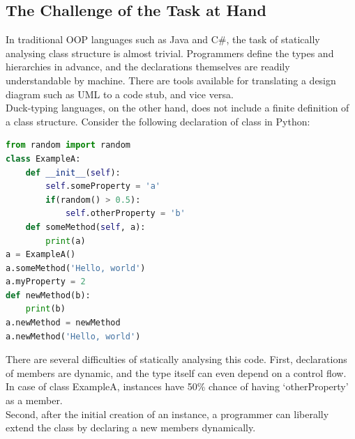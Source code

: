 \documentclass[a4paper,12pt]{article}
\begin{document}
\subsection{The Challenge of the Task at Hand}
In traditional OOP languages such as Java and C\#, the task of statically analysing class structure is almost trivial. Programmers define the types and hierarchies in advance, and the declarations themselves are readily understandable by machine. There are tools available for translating a design diagram such as UML to a code stub, and vice versa.\\
Duck-typing languages, on the other hand, does not include a finite definition of a class structure. Consider the following declaration of class in Python:\\
\begin{lstlisting}[caption=Python class creation, language=Python]
from random import random
class ExampleA:
    def __init__(self):
        self.someProperty = 'a'
        if(random() > 0.5):
            self.otherProperty = 'b'
    def someMethod(self, a):
        print(a)
a = ExampleA()
a.someMethod('Hello, world')
a.myProperty = 2
def newMethod(b):
    print(b)
a.newMethod = newMethod
a.newMethod('Hello, world')
\end{lstlisting}
There are several difficulties of statically analysing this code. First, declarations of members are dynamic, and the type itself can even depend on a control flow. In case of class ExampleA, instances have 50\% chance of having `otherProperty' as a member.\\
Second, after the initial creation of an instance, a programmer can liberally extend the class by declaring a new members dynamically.
\end{document}

